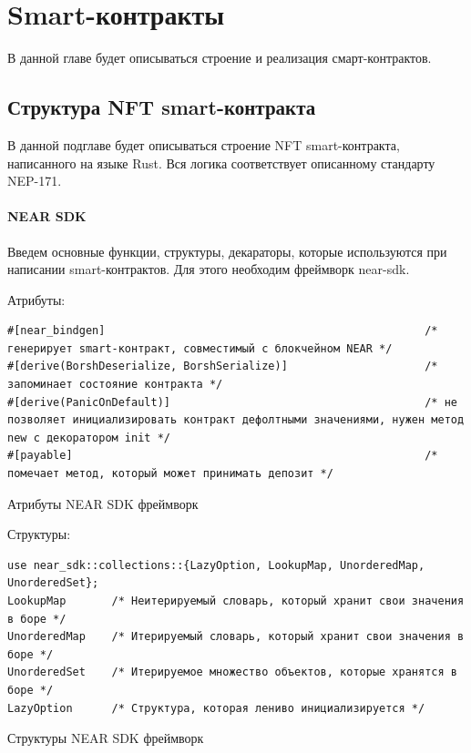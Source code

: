 \section{Smart-контракты}
\label{section.main.smart}

В данной главе будет описываться строение и реализация смарт-контрактов.

\subsection{Структура NFT smart-контракта}
\label{section.main.smart.struct}
В данной подглаве будет описываться строение NFT smart-контракта, написанного на языке Rust. Вся логика соответствует описанному стандарту NEP-171\cite{nftstandart}.
\paragraph{NEAR SDK}
Введем основные функции, структуры, декараторы, которые используются при написании smart-контрактов. Для этого необходим фреймворк near-sdk\cite{nearsdkrs}.

Атрибуты:

\begin{listing}[H]
\begin{verbatim}
#[near_bindgen]                                                 /* генерирует smart-контракт, совместимый с блокчейном NEAR */
#[derive(BorshDeserialize, BorshSerialize)]                     /* запоминает состояние контракта */
#[derive(PanicOnDefault)]                                       /* не позволяет инициализировать контракт дефолтными значениями, нужен метод new с декоратором init */
#[payable]                                                      /* помечает метод, который может принимать депозит */
\end{verbatim}
\caption{Атрибуты NEAR SDK фреймворк}
\label{near.attributes}
\end{listing}

Структуры:

\begin{listing}[H]
\begin{verbatim}
use near_sdk::collections::{LazyOption, LookupMap, UnorderedMap, UnorderedSet};
LookupMap       /* Неитерируемый словарь, который хранит свои значения в боре */
UnorderedMap    /* Итерируемый словарь, который хранит свои значения в боре */
UnorderedSet    /* Итерируемое множество объектов, которые хранятся в боре */
LazyOption      /* Структура, которая лениво инициализируется */
\end{verbatim}
\caption{Структуры NEAR SDK фреймворк}
\label{near.structures}
\end{listing}

